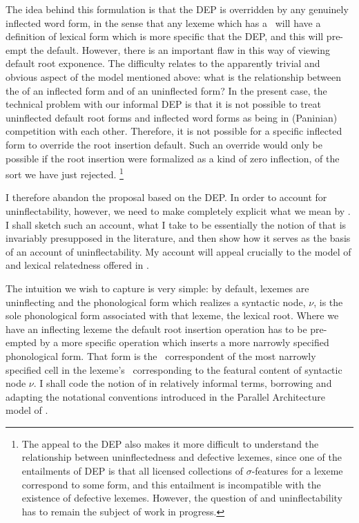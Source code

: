 \documentclass[output=paper,colorlinks,citecolor=brown]{langscibook}
\begin{document}
The idea behind this formulation is that the DEP is overridden by any genuinely inflected word form, in the sense that any lexeme which has a \PF\ will have a definition of lexical form which is more specific that the DEP, and this will pre-empt the default.  %
However, there is an important flaw in this way of viewing default root exponence. The difficulty relates to the apparently trivial and obvious aspect of the model mentioned above: what is the relationship between the  of an inflected form and  of an uninflected form? In the present case, the technical problem with our informal DEP is that it is not possible to treat uninflected default root forms and inflected word forms as being in (Paninian) competition with each other. Therefore, it is not possible for a specific inflected form to override the root insertion default. Such an override would only be possible if the root insertion were formalized as a kind of zero inflection, of the sort we have just rejected.%
\footnote{The appeal to the DEP also makes it more difficult to understand the relationship between uninflectedness and defective lexemes, since one of the entailments of DEP is that all licensed collections of $\sigma$-features for a lexeme correspond to some form, and this entailment is incompatible with the existence of defective lexemes. However, the question of  and uninflectability has to remain the subject of work in progress.
}

I therefore abandon the proposal based on the DEP. In order to account for uninflectability, however, we need  to make completely explicit what we mean by . I shall sketch such an account, what I take to be essentially the notion of  that is invariably presupposed in the literature, and then show how it serves as the basis of an account of uninflectability. My account will appeal crucially to the model of  and lexical relatedness offered in \citet{spencer2013}.


The intuition we wish to capture is very simple: by default, lexemes are uninflecting and the phonological form which realizes a syntactic node, $\nu$, is the sole phonological form associated with that lexeme, the lexical root. Where we have an inflecting lexeme the default root insertion operation has to be pre-empted by a more specific operation which inserts a more narrowly specified phonological form. That form is the \PF\ correspondent of  the most narrowly specified cell in the lexeme's \PC\, corresponding to the featural content of syntactic node $\nu$. I shall code the notion of  in relatively informal terms, borrowing and adapting the notational conventions introduced in the Parallel Architecture model of \citet{jackendoffaudring2020}. 
\end{document}
